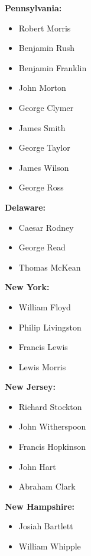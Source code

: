 \begin{multicols}{3}
\begin{itemize}[wide,itemsep=8pt,label=,labelsep=*,]
{%

\item \textbf{Pennsylvania:}
\begin{itemize}[wide,label=,itemsep=0pt,topsep=0pt]
\item Robert Morris
\item Benjamin Rush
\item Benjamin Franklin
\item John Morton
\item George Clymer
\item James Smith
\item George Taylor
\item James Wilson
\item George Ross
\end{itemize}

\item \textbf{Delaware:}
\begin{itemize}[wide,label=,itemsep=0pt,topsep=0pt]
\item Caesar Rodney
\item George Read
\item Thomas McKean
\end{itemize}


\item \textbf{New York:}
\begin{itemize}[wide,label=,itemsep=0pt,topsep=0pt]
\item William Floyd
\item Philip Livingston
\item Francis Lewis
\item Lewis Morris
\end{itemize}

\item \textbf{New Jersey:}
\begin{itemize}[wide,label=,itemsep=0pt,topsep=0pt]
\item Richard Stockton
\item John Witherspoon
\item Francis Hopkinson
\item John Hart
\item Abraham Clark
\end{itemize}


\item \textbf{New Hampshire:}
\begin{itemize}[wide,label=,itemsep=0pt,topsep=0pt]
\item Josiah Bartlett
\item William Whipple
\end{itemize}

}
\end{itemize}
\end{multicols}
